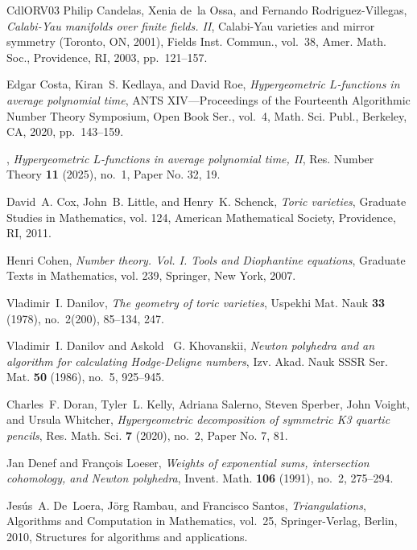 \documentclass[11pt, reqno]{amsart}
\theoremstyle{plain}
\theoremstyle{definition}
\begin{document}
\begin{thebibliography}{CdlORV03}
Philip Candelas, Xenia de~la Ossa, and Fernando Rodriguez-Villegas, \emph{Calabi-{Y}au manifolds over finite fields. {II}}, Calabi-{Y}au varieties and mirror symmetry ({T}oronto, {ON}, 2001), Fields Inst. Commun., vol.~38, Amer. Math. Soc., Providence, RI, 2003, pp.~121--157. 

Edgar Costa, Kiran~S. Kedlaya, and David Roe, \emph{Hypergeometric {$L$}-functions in average polynomial time}, A{NTS} {XIV}---{P}roceedings of the {F}ourteenth {A}lgorithmic {N}umber {T}heory {S}ymposium, Open Book Ser., vol.~4, Math. Sci. Publ., Berkeley, CA, 2020, pp.~143--159. 

\bysame, \emph{Hypergeometric {$L$}-functions in average polynomial time, {II}}, Res. Number Theory \textbf{11} (2025), no.~1, Paper No. 32, 19. 

David~A. Cox, John~B. Little, and Henry~K. Schenck, \emph{Toric varieties}, Graduate Studies in Mathematics, vol. 124, American Mathematical Society, Providence, RI, 2011. 

Henri Cohen, \emph{Number theory. {V}ol. {I}. {T}ools and {D}iophantine equations}, Graduate Texts in Mathematics, vol. 239, Springer, New York, 2007. 

Vladimir~I. Danilov, \emph{The geometry of toric varieties}, Uspekhi Mat. Nauk \textbf{33} (1978), no.~2(200), 85--134, 247. 

Vladimir~I. Danilov and Askold ~G. Khovanskii, \emph{Newton polyhedra and an algorithm for calculating {H}odge-{D}eligne numbers}, Izv. Akad. Nauk SSSR Ser. Mat. \textbf{50} (1986), no.~5, 925--945. 

Charles~F. Doran, Tyler~L. Kelly, Adriana Salerno, Steven Sperber, John Voight, and Ursula Whitcher, \emph{Hypergeometric decomposition of symmetric {K}3 quartic pencils}, Res. Math. Sci. \textbf{7} (2020), no.~2, Paper No. 7, 81. 

Jan Denef and Fran\c{c}ois Loeser, \emph{Weights of exponential sums, intersection cohomology, and {N}ewton polyhedra}, Invent. Math. \textbf{106} (1991), no.~2, 275--294. 

Jes\'us~A. De~Loera, J\"org Rambau, and Francisco Santos, \emph{Triangulations}, Algorithms and Computation in Mathematics, vol.~25, Springer-Verlag, Berlin, 2010, Structures for algorithms and applications. 


\end{thebibliography}
\end{document}
